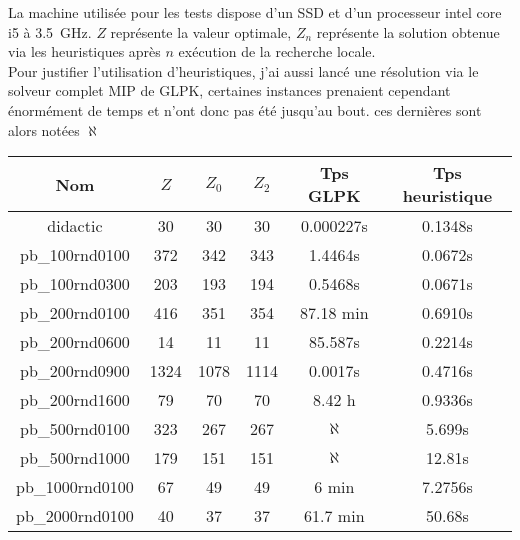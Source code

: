 \documentclass[ a4paper,10pt]{article}
\begin{document}
%
%

\vspace{5mm}
\noindent
{}
\vspace{2mm}

\noindent
La machine utilisée pour les tests dispose d'un SSD et d'un processeur intel core i5 à 3.5~GHz.
$Z$ représente la valeur optimale, $Z_n$ représente la solution obtenue via les heuristiques après $n$ exécution de la recherche locale. \\
Pour justifier l'utilisation d'heuristiques, j'ai aussi lancé une résolution via le solveur complet MIP de GLPK, certaines instances prenaient cependant énormément de temps et n'ont donc pas été jusqu'au bout. ces dernières sont alors notées $\aleph$

\bgroup
\def\arraystretch{1.4}
\begin{center}
\begin{tabular}{|c|c|c|c|c|c|}
\hline 
Nom & $Z$ & $Z_0$ & $Z_2$ &  Tps GLPK & Tps heuristique \\ 
\hline 
didactic & 30 & 30 & 30 & 0.000227s & 0.1348s\\ 
\hline 
pb\_100rnd0100 & 372 & 342 & 343 & 1.4464s & 0.0672s \\ 
\hline
pb\_100rnd0300 & 203 & 193 & 194 & 0.5468s & 0.0671s\\ 
\hline
pb\_200rnd0100 & 416 & 351 & 354 & 87.18 min & 0.6910s\\ 
\hline 
pb\_200rnd0600 & 14 & 11 & 11 & 85.587s & 0.2214s\\ 
\hline 
pb\_200rnd0900 & 1324 & 1078 & 1114 & 0.0017s & 0.4716s\\ 
\hline 
pb\_200rnd1600 & 79 & 70 & 70 & 8.42 h & 0.9336s\\ 
\hline 
pb\_500rnd0100 & 323 & 267 & 267 & $\aleph$ & 5.699s\\ 
\hline 
pb\_500rnd1000 & 179 & 151 & 151 & $\aleph$ & 12.81s\\ 
\hline 
pb\_1000rnd0100 & 67 & 49 & 49 & 6 min & 7.2756s \\ 
\hline 
pb\_2000rnd0100 & 40 & 37 & 37 & 61.7 min & 50.68s\\ 
\hline 
\end{tabular}
\end{center}
\egroup
\end{document}
